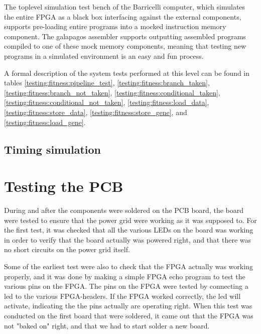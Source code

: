 The toplevel simulation test bench of the Barricelli computer, which simulates the entire FPGA as a black box interfacing against the external components, supports pre-loading entire programs into a mocked instruction memory component.
The \Gls{galapagos assembler} supports outputting assembled programs compiled to one of these mock memory components, meaning that testing new programs in a simulated environment is an easy and fun process.


A formal description of the system tests performed at this level can be found in tables
\ref{testing:fitness:pipeline_test},
\ref{testing:fitness:branch_taken},
\ref{testing:fitness:branch_not_taken},
\ref{testing:fitness:conditional_taken},
\ref{testing:fitness:conditional_not_taken},
\ref{testing:fitness:load_data},
\ref{testing:fitness:store_data},
\ref{testing:fitness:store_gene},
and
\ref{testing:fitness:load_gene}.














\subsection{Timing simulation}





\section{Testing the PCB}
During and after the components were soldered on the PCB board, the board were tested to ensure that the power grid were working as it was supposed to.
For the first test, it was checked that all the various LEDs on the board was working in order to verify that the board actually was powered right, and that there was
no short circuits on the power grid itself.

Some of the earliest test were also to check that the FPGA actually was working properly, and it was done by making a simple FPGA echo program to test the various pins on the FPGA.
The pins on the FPGA were tested by connecting a led to the various FPGA-headers. If the FPGA worked correctly, the led will activate, indicating the the pins actually are operating right.
When this test was conducted on the first board that were soldered, it came out that the FPGA was not "baked on" right, and that we had to start solder a new board. 

